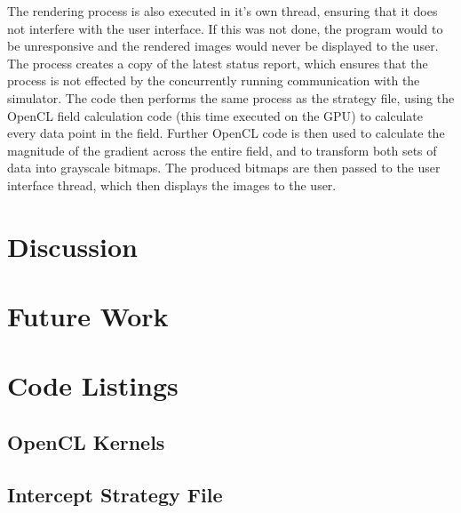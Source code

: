 \documentclass[10pt]{article} \usepackage[a4paper]{geometry}
\begin{document}
The rendering process is also executed in it's own thread, ensuring that it does
not interfere with the user interface. If this was not done, the program would
to be unresponsive and the rendered images would never be displayed to the user.
The process creates a copy of the latest status report, which ensures that the
process is not effected by the concurrently running communication with the
simulator. The code then performs the same process as the strategy file, using
the OpenCL field calculation code (this time executed on the \ac{GPU}) to
calculate every data point in the field. Further OpenCL code is then used to
calculate the magnitude of the gradient across the entire field, and to
transform both sets of data into grayscale bitmaps. The produced bitmaps are
then passed to the user interface thread, which then displays the images to the
user.

\section{Discussion}

\section{Future Work}

\appendix
\cleardoublepage{}

\section{Code Listings \label{sec:Code-Listings}}

\subsection{OpenCL Kernels\label{sub:OpenCL-Kernels}}

\subsection{Intercept Strategy File}

\cleardoublepage{}



\end{document}
